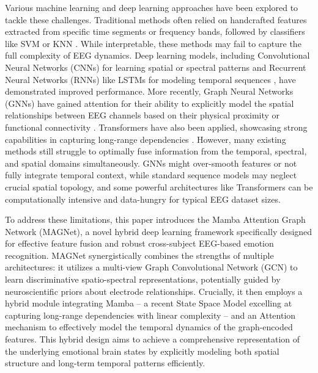 \documentclass[runningheads]{llncs}
\begin{document}
Various machine learning and deep learning approaches have been explored to tackle these challenges. Traditional methods often relied on handcrafted features extracted from specific time segments or frequency bands, followed by classifiers like SVM or KNN \cite{cite_traditional_ml}. While interpretable, these methods may fail to capture the full complexity of EEG dynamics. Deep learning models, including Convolutional Neural Networks (CNNs) for learning spatial or spectral patterns \cite{cite_cnn_eeg} and Recurrent Neural Networks (RNNs) like LSTMs for modeling temporal sequences \cite{cite_rnn_eeg}, have demonstrated improved performance. More recently, Graph Neural Networks (GNNs) have gained attention for their ability to explicitly model the spatial relationships between EEG channels based on their physical proximity or functional connectivity \cite{cite_gnn_eeg, Jin_PGCN_example}. Transformers have also been applied, showcasing strong capabilities in capturing long-range dependencies \cite{cite_transformer_eeg, Ding_EmT_example}. However, many existing methods still struggle to optimally fuse information from the temporal, spectral, and spatial domains simultaneously. GNNs might over-smooth features or not fully integrate temporal context, while standard sequence models may neglect crucial spatial topology, and some powerful architectures like Transformers can be computationally intensive and data-hungry for typical EEG dataset sizes.



To address these limitations, this paper introduces the Mamba Attention Graph Network (MAGNet), a novel hybrid deep learning framework specifically designed for effective feature fusion and robust cross-subject EEG-based emotion recognition. MAGNet synergistically combines the strengths of multiple architectures: it utilizes a multi-view Graph Convolutional Network (GCN) to learn discriminative spatio-spectral representations, potentially guided by neuroscientific priors about electrode relationships. Crucially, it then employs a hybrid module integrating Mamba – a recent State Space Model excelling at capturing long-range dependencies with linear complexity – and an Attention mechanism to effectively model the temporal dynamics of the graph-encoded features. This hybrid design aims to achieve a comprehensive representation of the underlying emotional brain states by explicitly modeling both spatial structure and long-term temporal patterns efficiently.
\end{document}
